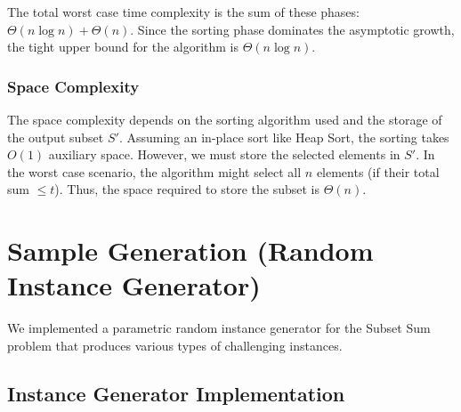 \documentclass[12pt,a4paper]{article}
\begin{document}
The total worst case time complexity is the sum of these phases: $\Theta(n \log n) + \Theta(n)$. Since the sorting phase dominates the asymptotic growth, the tight upper bound for the algorithm is $\Theta(n \log n)$.

\subsubsection{Space Complexity}
The space complexity depends on the sorting algorithm used and the storage of the output subset $S'$. Assuming an in-place sort like Heap Sort, the sorting takes $O(1)$ auxiliary space. However, we must store the selected elements in $S'$. In the worst case scenario, the algorithm might select all $n$ elements (if their total sum $\leq t$). Thus, the space required to store the subset is $\Theta(n)$.

\section{Sample Generation (Random Instance Generator)}

We implemented a parametric random instance generator for the Subset Sum problem that produces various types of challenging instances.

\subsection{Instance Generator Implementation}
\end{document}
